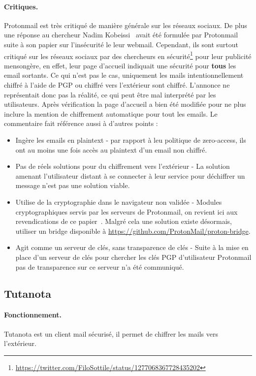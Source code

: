 \paragraph{Critiques.}
Protonmail est très critiqué de manière générale sur les réseaux sociaux. De plus une réponse au chercheur Nadim Kobeissi~\cite{DBLP:journals/iacr/Kobeissi18a} avait été formulée par Protonmail suite à son papier sur l'insécurité le leur webmail. Cependant, ils sont surtout critiqué sur les réseaux sociaux par des chercheurs en sécurité\footnote{\url{https://twitter.com/FiloSottile/status/1277068367728435202}} pour leur publicité mensongère, en effet, leur page d'accueil indiquait une sécurité pour \textbf{tous} les email sortants. Ce qui n'est pas le cas, uniquement les mails intentionnellement chiffré à l'aide de PGP ou chiffré vers l'extérieur sont chiffré. L'annonce ne représentait donc pas la réalité, ce qui peut être mal interprété par les utilisateurs. Après vérification la page d'accueil a bien été modifiée pour ne plus inclure la mention de chiffrement automatique pour tout les emails. Le commentaire fait référence aussi à d'autres points :
\begin{itemize}
	\item Ingère les emails en plaintext - par rapport à leu politique de zero-access, ils ont au moins une fois accès au plaintext d'un email non chiffré.
	\item Pas de réels solutions pour du chiffrement vers l'extérieur - La solution amenant l'utilisateur distant à se connecter à leur service pour déchiffrer un message n'est pas une solution viable.
	\item Utilise de la cryptographie dans le navigateur non validée - Modules cryptographiques servis par les serveurs de Protonmail, on revient ici aux revendications de ce papier~\cite{DBLP:journals/iacr/Kobeissi18a}. Malgré cela une solution existe désormais, utiliser un bridge disponible à \url{https://github.com/ProtonMail/proton-bridge}.
	\item Agit comme un serveur de clés, sans transparence de clés - Suite à la mise en place d'un serveur de clés pour chercher les clés PGP d'utilisateur Protonmail pas de transparence sur ce serveur n'a été communiqué.
\end{itemize}
\subsection{Tutanota}
\paragraph*{Fonctionnement.}
Tutanota est un client mail sécurisé, il permet de chiffrer les mails vers l'extérieur. 

